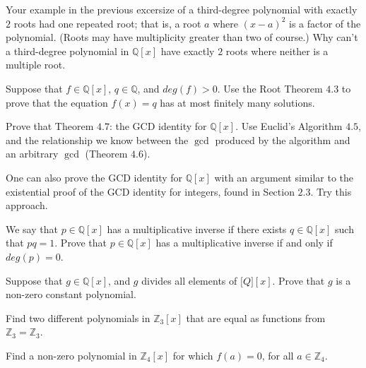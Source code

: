 \begin{tcolorbox}[title=Problem 4, breakable]
    Your example in the previous excersize of a third-degree polynomial with 
    exactly $2$ roots had one repeated root; that is, a root $a$ where $(x - a)^2$
    is a factor of the polynomial. (Roots may have multiplicity greater than two 
    of course.) Why can't a third-degree polynomial in $\mathbb{Q}[x]$ have 
    exactly $2$ roots where neither is a multiple root.
\end{tcolorbox}

\begin{tcolorbox}[title=Problem 6, breakable]
    Suppose that $f \in \mathbb{Q}[x]$, $q \in \mathbb{Q}$,
    and $deg(f) > 0$. Use the Root Theorem $4.3$ to prove that
    the equation $f(x) = q$ has at most finitely many solutions.
\end{tcolorbox}

\begin{tcolorbox}[title=Problem 8, breakable]
    Prove that Theorem $4.7$: the GCD identity for $\mathbb{Q}[x]$.
    Use Euclid's Algorithm $4.5$, and the relationship we know 
    between the $\gcd$ produced by the algorithm and an arbitrary $\gcd$ (Theorem $4.6$).
\end{tcolorbox}

\begin{tcolorbox}[title=Problem 9, breakable]
    One can also prove the GCD identity for $\mathbb{Q}[x]$ with an argument 
    similar to the existential proof of the GCD identity for integers,
    found in Section $2.3$. Try this approach.
\end{tcolorbox}

\begin{tcolorbox}[title=Problem 10, breakable]
    We say that $p \in \mathbb{Q}[x]$ has a multiplicative inverse 
    if there exists $q \in \mathbb{Q}[x]$ such that $pq = 1$.
    Prove that $p \in \mathbb{Q}[x]$ has a multiplicative inverse 
    if and only if $deg(p) = 0$.
\end{tcolorbox}

\begin{tcolorbox}[title=Problem 11, breakable]
    Suppose that $g \in \mathbb{Q}[x]$, and $g$ divides all elements 
    of $\mathbb[Q][x]$. Prove that $g$ is a non-zero constant polynomial.
\end{tcolorbox}

\begin{tcolorbox}[title=Problem 12, breakable]
    Find two different polynomials in $\mathbb{Z}_3[x]$ that are equal 
    as functions from $\mathbb{Z}_3 = \mathbb{Z}_3$.
\end{tcolorbox}

\begin{tcolorbox}[title=Problem 13, breakable]
    Find a non-zero polynomial in $\mathbb{Z}_4[x]$ for which $f(a) = 0$,
    for all $a \in \mathbb{Z}_4$.
\end{tcolorbox}